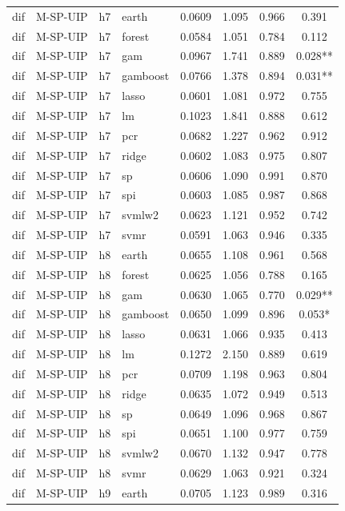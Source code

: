 \begin{ThreePartTable}
\begin{longtable}[t]{llclcccc}
\addlinespace
dif & M-SP-UIP & h7 & earth & 0.0609 & 1.095 & 0.966 & 0.391\\
dif & M-SP-UIP & h7 & forest & 0.0584 & 1.051 & 0.784 & 0.112\\
dif & M-SP-UIP & h7 & gam & 0.0967 & 1.741 & 0.889 & 0.028**\\
dif & M-SP-UIP & h7 & gamboost & 0.0766 & 1.378 & 0.894 & 0.031**\\
dif & M-SP-UIP & h7 & lasso & 0.0601 & 1.081 & 0.972 & 0.755\\
dif & M-SP-UIP & h7 & lm & 0.1023 & 1.841 & 0.888 & 0.612\\
dif & M-SP-UIP & h7 & pcr & 0.0682 & 1.227 & 0.962 & 0.912\\
dif & M-SP-UIP & h7 & ridge & 0.0602 & 1.083 & 0.975 & 0.807\\
dif & M-SP-UIP & h7 & sp & 0.0606 & 1.090 & 0.991 & 0.870\\
dif & M-SP-UIP & h7 & spi & 0.0603 & 1.085 & 0.987 & 0.868\\
dif & M-SP-UIP & h7 & svmlw2 & 0.0623 & 1.121 & 0.952 & 0.742\\
dif & M-SP-UIP & h7 & svmr & 0.0591 & 1.063 & 0.946 & 0.335\\
\addlinespace
dif & M-SP-UIP & h8 & earth & 0.0655 & 1.108 & 0.961 & 0.568\\
dif & M-SP-UIP & h8 & forest & 0.0625 & 1.056 & 0.788 & 0.165\\
dif & M-SP-UIP & h8 & gam & 0.0630 & 1.065 & 0.770 & 0.029**\\
dif & M-SP-UIP & h8 & gamboost & 0.0650 & 1.099 & 0.896 & 0.053*\\
dif & M-SP-UIP & h8 & lasso & 0.0631 & 1.066 & 0.935 & 0.413\\
dif & M-SP-UIP & h8 & lm & 0.1272 & 2.150 & 0.889 & 0.619\\
dif & M-SP-UIP & h8 & pcr & 0.0709 & 1.198 & 0.963 & 0.804\\
dif & M-SP-UIP & h8 & ridge & 0.0635 & 1.072 & 0.949 & 0.513\\
dif & M-SP-UIP & h8 & sp & 0.0649 & 1.096 & 0.968 & 0.867\\
dif & M-SP-UIP & h8 & spi & 0.0651 & 1.100 & 0.977 & 0.759\\
dif & M-SP-UIP & h8 & svmlw2 & 0.0670 & 1.132 & 0.947 & 0.778\\
dif & M-SP-UIP & h8 & svmr & 0.0629 & 1.063 & 0.921 & 0.324\\
\addlinespace
dif & M-SP-UIP & h9 & earth & 0.0705 & 1.123 & 0.989 & 0.316\\

\end{longtable}
\end{ThreePartTable}
